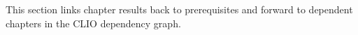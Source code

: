 This section links chapter results back to prerequisites and forward to dependent chapters in the CLIO dependency graph.
